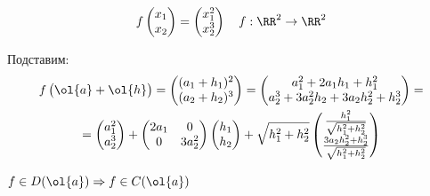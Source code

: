 \begin{example}{}{}
    \[
        f \begin{pmatrix}
            x_1
            \\
            x_2
        \end{pmatrix}
        =
        \begin{pmatrix}
            x_1^2
            \\
            x_2^3
        \end{pmatrix}
        \quad
        f : \RR^2 \to \RR^2
    \]

    Подставим:
    \begin{gather*}
        f \begin{pmatrix}
            \ol{a} + \ol{h}
        \end{pmatrix}
        =
        \begin{pmatrix}
            (a_1 + h_1)^2
            \\
            (a_2 + h_2)^3
        \end{pmatrix}
        =
        \begin{pmatrix}
            a_1^2 + 2 a_1 h_1 + h_1^2
            \\
            a_2^3 + 3 a_2^2 h_2 + 3 a_2 h_2^2 + h_2^3
        \end{pmatrix}
        =
        \\
        =
        \begin{pmatrix}
            a_1^2
            \\
            a_2^3
        \end{pmatrix}
        +
        \begin{pmatrix}
            2a_1 & 0
            \\
            0 & 3a_2^2
        \end{pmatrix}
        \begin{pmatrix}
            h_1
            \\
            h_2
        \end{pmatrix}
        +
        \sqrt{h_1^2 + h_2^2}
        \begin{pmatrix}
            \frac{h_1^2}{\sqrt{h_1^2 + h_2^2}}
            \\
            \frac{3 a_2 h_2^2 + h_2^3}{\sqrt{h_1^2 + h_2^2}}
        \end{pmatrix}
    \end{gather*}
\end{example}

\begin{prop}{}{}
    \( f \in D(\ol{a}) \Rightarrow f \in C(\ol{a}) \)
\end{prop}

